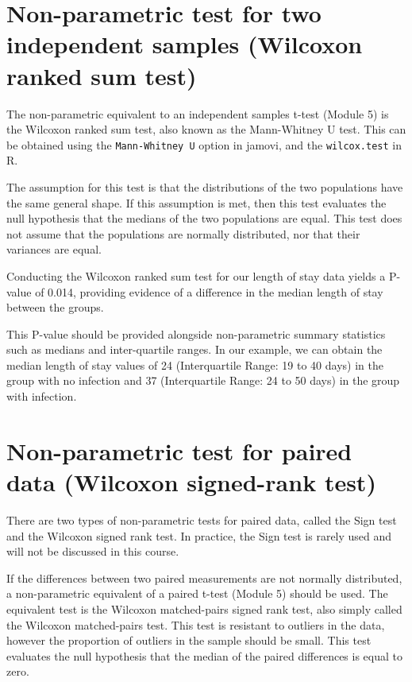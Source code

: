 \documentclass[
  a4paper,
]{memoir}
\begin{document}
\section{Non-parametric test for two independent samples (Wilcoxon
ranked sum
test)}\label{non-parametric-test-for-two-independent-samples-wilcoxon-ranked-sum-test}

The non-parametric equivalent to an independent samples t-test (Module
5) is the Wilcoxon ranked sum test, also known as the Mann-Whitney U
test. This can be obtained using the \texttt{Mann-Whitney\ U} option in
jamovi, and the \texttt{wilcox.test} in R.

The assumption for this test is that the distributions of the two
populations have the same general shape. If this assumption is met, then
this test evaluates the null hypothesis that the medians of the two
populations are equal. This test does not assume that the populations
are normally distributed, nor that their variances are equal.

Conducting the Wilcoxon ranked sum test for our length of stay data
yields a P-value of 0.014, providing evidence of a difference in the
median length of stay between the groups.

This P-value should be provided alongside non-parametric summary
statistics such as medians and inter-quartile ranges. In our example, we
can obtain the median length of stay values of 24 (Interquartile Range:
19 to 40 days) in the group with no infection and 37 (Interquartile
Range: 24 to 50 days) in the group with infection.

\section{Non-parametric test for paired data (Wilcoxon signed-rank
test)}\label{non-parametric-test-for-paired-data-wilcoxon-signed-rank-test}

There are two types of non-parametric tests for paired data, called the
Sign test and the Wilcoxon signed rank test. In practice, the Sign test
is rarely used and will not be discussed in this course.

If the differences between two paired measurements are not normally
distributed, a non-parametric equivalent of a paired t-test (Module 5)
should be used. The equivalent test is the Wilcoxon matched-pairs signed
rank test, also simply called the Wilcoxon matched-pairs test. This test
is resistant to outliers in the data, however the proportion of outliers
in the sample should be small. This test evaluates the null hypothesis
that the median of the paired differences is equal to zero.
\end{document}
